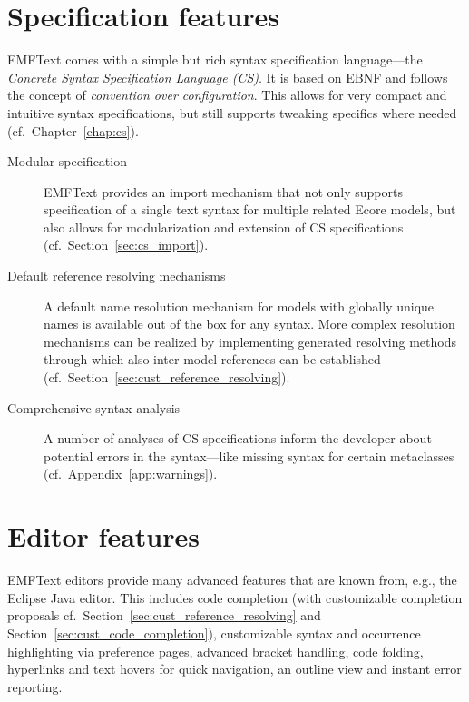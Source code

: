 \section{Specification features}

EMFText comes with a simple but rich syntax specification language---the
\emph{Concrete Syntax Specification Language (CS)}. It is based on EBNF 
and follows the concept of \emph{convention over configuration}. This 
allows for very compact and intuitive syntax specifications, but still 
supports tweaking specifics where needed (cf.~Chapter~\ref{chap:cs}).

\begin{description}

  \item[Modular specification]
        EMFText provides an import mechanism that not only supports specification 
        of a single text syntax for multiple related Ecore models, but also allows 
        for modularization and extension of CS specifications (cf.~Section~\ref{sec:cs_import}).

  \item[Default reference resolving mechanisms]
        A default name resolution mechanism for models with globally unique 
        names is available out of the box for any syntax. More complex resolution 
        mechanisms can be realized by implementing generated resolving methods 
        through which also inter-model references can be established 
        (cf.~Section~\ref{sec:cust_reference_resolving}).

  \item[Comprehensive syntax analysis]
        A number of analyses of CS specifications inform the developer about 
        potential errors in the syntax---like missing syntax for certain 
        metaclasses (cf.~Appendix~\ref{app:warnings}).

\end{description}


\section{Editor features}

EMFText editors provide many advanced features that are known from, e.g., the 
Eclipse Java editor. This includes code completion (with customizable completion
proposals cf.~Section~\ref{sec:cust_reference_resolving}\label{sec:cust_reference_resolving} 
and Section~\ref{sec:cust_code_completion}), customizable syntax and occurrence 
highlighting via preference pages, advanced bracket handling, code folding, 
hyperlinks and text hovers for quick navigation, an outline view and instant error reporting.


